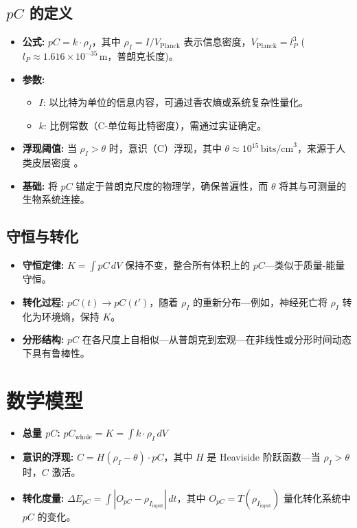 \documentclass[11pt]{article}
\begin{document}
\subsection{$pC$ 的定义}
\begin{itemize}
    \item \textbf{公式:} $pC = k \cdot \rho_I$，其中 $\rho_I = I / V_{\text{Planck}}$ 表示信息密度，$V_{\text{Planck}} = l_P^3$ ($l_P \approx 1.616 \times 10^{-35} \, \text{m}$，普朗克长度)。
    \item \textbf{参数:}
    \begin{itemize}
        \item $I$: 以比特为单位的信息内容，可通过香农熵或系统复杂性量化。
        \item $k$: 比例常数（C-单位每比特密度），需通过实证确定。
    \end{itemize}
    \item \textbf{浮现阈值:} 当 $\rho_I > \theta$ 时，意识（C）浮现，其中 $\theta \approx 10^{15} \, \text{bits/cm}^3$，来源于人类皮层密度 \citep{laughlin2003communication}。
    \item \textbf{基础:} 将 $pC$ 锚定于普朗克尺度的物理学，确保普遍性，而 $\theta$ 将其与可测量的生物系统连接。
\end{itemize}

\subsection{守恒与转化}
\begin{itemize}
    \item \textbf{守恒定律:} $K = \int pC \, dV$ 保持不变，整合所有体积上的 $pC$—类似于质量-能量守恒。
    \item \textbf{转化过程:} $pC(t) \rightarrow pC(t')$，随着 $\rho_I$ 的重新分布—例如，神经死亡将 $\rho_I$ 转化为环境熵，保持 $K$。
    \item \textbf{分形结构:} $pC$ 在各尺度上自相似—从普朗克到宏观—在非线性或分形时间动态下具有鲁棒性。
\end{itemize}

\section{数学模型}
\begin{itemize}
    \item \textbf{总量 $pC$:} $pC_{\text{whole}} = K = \int k \cdot \rho_I \, dV$
    \item \textbf{意识的浮现:} $C = H(\rho_I - \theta) \cdot pC$，其中 $H$ 是 Heaviside 阶跃函数—当 $\rho_I > \theta$ 时，$C$ 激活。
    \item \textbf{转化度量:} $\Delta E_{pC} = \int |O_{pC} - \rho_{I_{\text{input}}}| \, dt$，其中 $O_{pC} = T(\rho_{I_{\text{input}}})$ 量化转化系统中 $pC$ 的变化。
\end{itemize}
\end{document}
